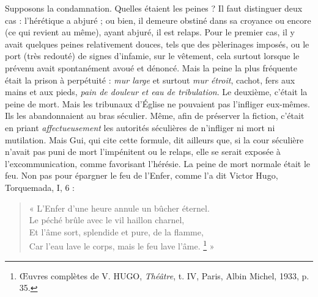 \documentclass[french,twoside]{book} %
\begin{document}
Supposons la condamnation. Quelles étaient les peines ? Il faut distinguer deux cas : l’hérétique a abjuré ; ou bien, il demeure  
\label{p106} obstiné dans sa croyance ou encore (ce qui revient au même), ayant abjuré, il est relaps. Pour le premier cas, il y avait quelques peines relativement douces, tels que des pèlerinages imposés, ou le port (très redouté) de signes d’infamie, sur le vêtement, cela surtout lorsque le prévenu avait spontanément avoué et dénoncé. Mais la peine la plus fréquente était la prison à perpétuité : \emph{mur large} et surtout \emph{mur étroit}, cachot, fers aux mains et aux pieds, \emph{pain de douleur et eau de tribulation}. Le deuxième, c’était la peine de mort. Mais les tribunaux d’Église ne pouvaient pas l’infliger eux-mêmes. Ils les abandonnaient au bras séculier. Même, afin de préserver la fiction, c’était en priant \emph{affectueusement} les autorités séculières de n’infliger ni mort ni mutilation. Mais Gui, qui cite cette formule, dit ailleurs que, si la cour séculière n’avait pas puni de mort l’impénitent ou le relaps, elle se serait exposée à l’excommunication, comme favorisant l’hérésie. La peine de mort normale était le feu. Non pas pour épargner le feu de l’Enfer, comme l’a dit Victor Hugo, Torquemada, I, 6 :\par


\begin{verse}
« L’Enfer d’une heure annule un bûcher éternel.\\
Le péché brûle avec le vil haillon charnel,\\
Et l’âme sort, splendide et pure, de la flamme,\\
Car l’eau lave le corps, mais le feu lave l’âme. \footnote{ Œuvres complètes de V. HUGO, {\itshape Théâtre}, t. IV, Paris, Albin Michel, 1933, p. 35.} »\\
\end{verse}
\end{document}
